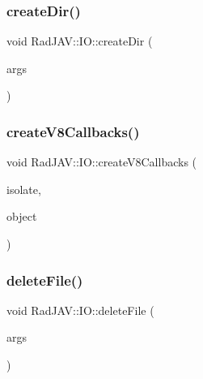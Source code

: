 \subsubsection{\texorpdfstring{create\+Dir()}{createDir()}}
{\footnotesize\ttfamily void Rad\+J\+A\+V\+::\+I\+O\+::create\+Dir (\begin{DoxyParamCaption}\item[{const v8\+::\+Function\+Callback\+Info$<$ v8\+::\+Value $>$ \&}]{args }\end{DoxyParamCaption})\hspace{0.3cm}{\ttfamily [static]}}

\mbox{\label{class_rad_j_a_v_1_1_i_o_ae48cb9566451e8fb3b77456db7f4dca4}} 
\subsubsection{\texorpdfstring{create\+V8\+Callbacks()}{createV8Callbacks()}}
{\footnotesize\ttfamily void Rad\+J\+A\+V\+::\+I\+O\+::create\+V8\+Callbacks (\begin{DoxyParamCaption}\item[{v8\+::\+Isolate $\ast$}]{isolate,  }\item[{v8\+::\+Local$<$ v8\+::\+Object $>$}]{object }\end{DoxyParamCaption})\hspace{0.3cm}{\ttfamily [static]}}

\mbox{\label{class_rad_j_a_v_1_1_i_o_a594342dee1c500ba7b1fd7f40b211858}} 
\subsubsection{\texorpdfstring{delete\+File()}{deleteFile()}}
{\footnotesize\ttfamily void Rad\+J\+A\+V\+::\+I\+O\+::delete\+File (\begin{DoxyParamCaption}\item[{const v8\+::\+Function\+Callback\+Info$<$ v8\+::\+Value $>$ \&}]{args }\end{DoxyParamCaption})\hspace{0.3cm}{\ttfamily [static]}}

